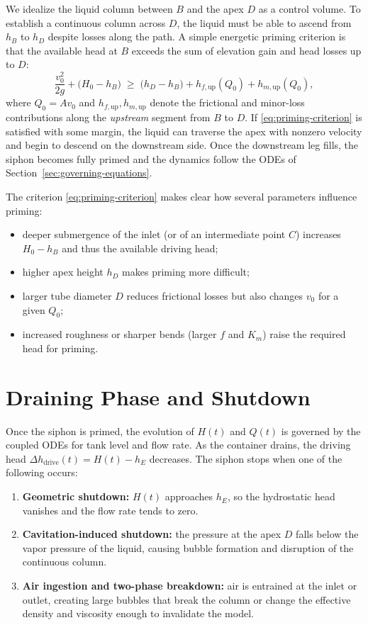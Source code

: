 \documentclass[11pt]{article}
\begin{document}
We idealize the liquid column between $B$ and the apex $D$ as a control volume.
To establish a continuous column across $D$, the liquid must be able to ascend from $h_B$ to $h_D$ despite losses along the path.
A simple energetic priming criterion is that the available head at $B$ exceeds the sum of elevation gain and head losses up to $D$:
\begin{equation}
  \frac{v_0^2}{2g}
  + \bigl(H_0 - h_B\bigr)
  \;\ge\;
  \bigl(h_D - h_B\bigr)
  + h_{f,\text{up}}(Q_0)
  + h_{m,\text{up}}(Q_0),
  \label{eq:priming-criterion}
\end{equation}
where $Q_0 = A v_0$ and $h_{f,\text{up}}, h_{m,\text{up}}$ denote the frictional and minor-loss contributions along the \emph{upstream} segment from $B$ to $D$.
If \eqref{eq:priming-criterion} is satisfied with some margin, the liquid can traverse the apex with nonzero velocity and begin to descend on the downstream side.
Once the downstream leg fills, the siphon becomes fully primed and the dynamics follow the ODEs of Section~\ref{sec:governing-equations}.

The criterion \eqref{eq:priming-criterion} makes clear how several parameters influence priming:
\begin{itemize}
  \item deeper submergence of the inlet (or of an intermediate point $C$) increases $H_0 - h_B$ and thus the available driving head;
  \item higher apex height $h_D$ makes priming more difficult;
  \item larger tube diameter $D$ reduces frictional losses but also changes $v_0$ for a given $Q_0$;
  \item increased roughness or sharper bends (larger $f$ and $K_m$) raise the required head for priming.
\end{itemize}

\section{Draining Phase and Shutdown}
\label{sec:draining}

Once the siphon is primed, the evolution of $H(t)$ and $Q(t)$ is governed by the coupled ODEs for tank level and flow rate.
As the container drains, the driving head $\Delta h_{\text{drive}}(t) = H(t) - h_E$ decreases.
The siphon stops when one of the following occurs:
\begin{enumerate}
  \item \textbf{Geometric shutdown:} $H(t)$ approaches $h_E$, so the hydrostatic head vanishes and the flow rate tends to zero.
  \item \textbf{Cavitation-induced shutdown:} the pressure at the apex $D$ falls below the vapor pressure of the liquid, causing bubble formation and disruption of the continuous column.
  \item \textbf{Air ingestion and two-phase breakdown:} air is entrained at the inlet or outlet, creating large bubbles that break the column or change the effective density and viscosity enough to invalidate the model.
\end{enumerate}
\end{document}

